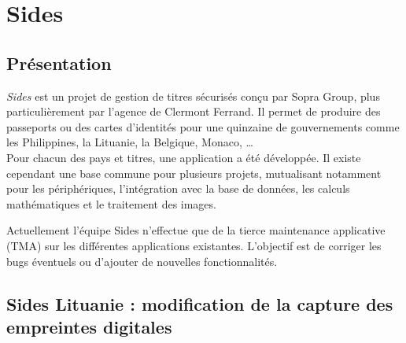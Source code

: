 \cleardoublepage

\chapter{Sides}


\section{Présentation}

\textit{Sides} est un projet de gestion de titres sécurisés conçu par Sopra Group, plus particulièrement par l'agence de Clermont Ferrand.
Il permet de produire des passeports ou des cartes d'identités pour une quinzaine de gouvernements comme les Philippines, la Lituanie, la Belgique, Monaco, \ldots
\\

Pour chacun des pays et titres, une application a été développée.
Il existe cependant une base commune pour plusieurs projets, mutualisant notamment pour les périphériques, l'intégration avec la base de données, les calculs mathématiques et le traitement des images.

Actuellement l'équipe Sides n'effectue que de la tierce maintenance applicative (TMA) sur les différentes applications existantes.
L'objectif est de corriger les bugs éventuels ou d'ajouter de nouvelles fonctionnalités.


\section{Sides Lituanie : modification de la capture des empreintes digitales}


